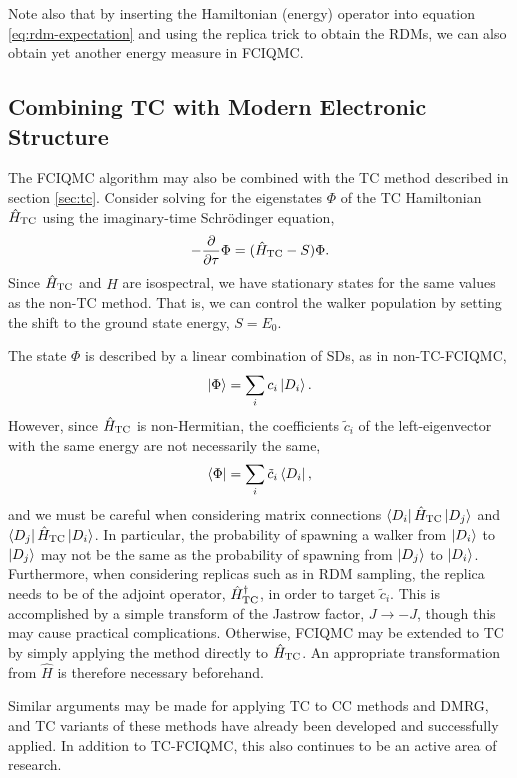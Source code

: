Note also that by inserting the Hamiltonian (energy) operator into equation \ref{eq:rdm-expectation} and using the replica trick to obtain the RDMs, we can also obtain yet another energy measure in FCIQMC.

\subsection{Combining TC with Modern Electronic Structure}

The \gls{FCIQMC} algorithm may also be combined with the \gls{TC} method described in section \ref{sec:tc}.\supercite{Luo_tc_fciqmc_2018} Consider solving for the eigenstates $\Phi$ of the TC Hamiltonian $\hat H_\mathrm{TC}$ using the imaginary-time Schr\"odinger equation,
\begin{equation}
    -\frac{\partial}{\partial\tau}\Phi = (\hat H_\mathrm{TC} - S)\Phi.
\end{equation}
Since $\hat H_\mathrm{TC}$ and $\hat H$ are isospectral, we have stationary states for the same values as the non-TC method. That is, we can control the walker population by setting the shift to the ground state energy, $S=E_0$.

The state $\Phi$ is described by a linear combination of \glspl{SD}, as in non-TC-FCIQMC,
\begin{equation}
    \ket\Phi = \sum_i c_i \ket{D_i}.
\end{equation}
However, since $\hat H_\mathrm{TC}$ is non-Hermitian, the coefficients $\tilde c_i$ of the left-eigenvector with the same energy are not necessarily the same,
\begin{equation}
    \bra\Phi = \sum_i \tilde c_i \bra{D_i},
\end{equation}
and we must be careful when considering matrix connections $\bra{D_i}\hat H_\mathrm{TC}\ket{D_j}$ and $\bra{D_j}\hat H_\mathrm{TC}\ket{D_i}$. In particular, the probability of spawning a walker from $\ket{D_i}$ to $\ket{D_j}$ may not be the same as the probability of spawning from $\ket{D_j}$ to $\ket{D_i}$. Furthermore, when considering replicas such as in RDM sampling, the replica needs to be of the adjoint operator, $\hat H_\mathrm{TC}^\dag$, in order to target $\tilde c_i$. This is accomplished by a simple transform of the Jastrow factor, $J\to -J$, though this may cause practical complications. Otherwise, \gls{FCIQMC} may be extended to \gls{TC} by simply applying the method directly to $\hat H_\mathrm{TC}$. An appropriate transformation from $\hat H$ is therefore necessary beforehand.

Similar arguments may be made for applying \gls{TC} to \gls{CC} methods\supercite{schraivogelTranscorrelated2021,schraivogelTranscorrelated2023} and \gls{DMRG},\supercite{baiardiTranscorrelated2020} and \gls{TC} variants of these methods have already been developed and successfully applied. In addition to TC-FCIQMC, this also continues to be an active area of research.
